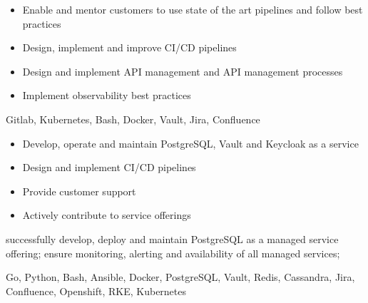 \documentclass[9pt,a4paper]{altacv}
\begin{document}
%
\makebox[0pt][l]{%
  \hspace{-4cm}
  \raisebox{-\totalheight}[0pt][0pt]{%
   {\color{background}\fontsize{250}{48}\faRocket}
}}%

%


\begin{itemize}
\item Enable and mentor customers to use state of the art pipelines and follow best practices
\item Design, implement and improve CI/CD pipelines
\item Design and implement API management and API management processes
\item Implement observability best practices
\end{itemize}


Gitlab, Kubernetes, Bash, Docker, Vault, Jira, Confluence


\divider

%


\begin{itemize}
\item Develop, operate and maintain PostgreSQL, Vault and Keycloak as a service
\item Design and implement CI/CD pipelines
\item Provide customer support
\item Actively contribute to service offerings
\end{itemize}

successfully develop, deploy and maintain PostgreSQL as a managed service offering;
ensure monitoring, alerting and availability of all managed services;


Go, Python, Bash, Ansible, Docker, PostgreSQL, Vault, Redis, Cassandra, Jira, Confluence, Openshift, RKE, Kubernetes
\end{document}
